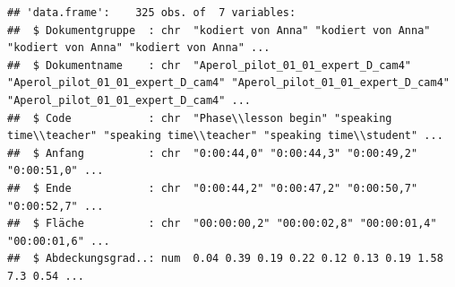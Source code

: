 \documentclass[
  english,
  man,floatsintext]{apa6}
\begin{document}
\begin{verbatim}
## 'data.frame':    325 obs. of  7 variables:
##  $ Dokumentgruppe  : chr  "kodiert von Anna" "kodiert von Anna" "kodiert von Anna" "kodiert von Anna" ...
##  $ Dokumentname    : chr  "Aperol_pilot_01_01_expert_D_cam4" "Aperol_pilot_01_01_expert_D_cam4" "Aperol_pilot_01_01_expert_D_cam4" "Aperol_pilot_01_01_expert_D_cam4" ...
##  $ Code            : chr  "Phase\\lesson begin" "speaking time\\teacher" "speaking time\\teacher" "speaking time\\student" ...
##  $ Anfang          : chr  "0:00:44,0" "0:00:44,3" "0:00:49,2" "0:00:51,0" ...
##  $ Ende            : chr  "0:00:44,2" "0:00:47,2" "0:00:50,7" "0:00:52,7" ...
##  $ Fläche          : chr  "00:00:00,2" "00:00:02,8" "00:00:01,4" "00:00:01,6" ...
##  $ Abdeckungsgrad..: num  0.04 0.39 0.19 0.22 0.12 0.13 0.19 1.58 7.3 0.54 ...
\end{verbatim}
\end{document}
